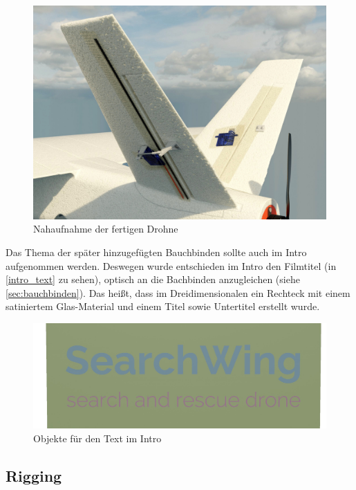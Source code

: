 \begin{figure}[H]
\begin{center}
\includegraphics[width=\textwidth]{gfx/prod/plane/shading.jpg}
\caption{Nahaufnahme der fertigen Drohne}
\label{shading}
\end{center}
\end{figure}

Das Thema der später hinzugefügten Bauchbinden sollte auch im Intro aufgenommen werden. Deswegen wurde entschieden im Intro den Filmtitel (in \autoref{intro_text} zu sehen), optisch an die Bachbinden anzugleichen (siehe \autoref{sec:bauchbinden}). Das heißt, dass im Dreidimensionalen ein Rechteck mit einem satiniertem Glas-Material und einem Titel sowie Untertitel erstellt wurde.

\begin{figure}[H]
\begin{center}
\includegraphics[width=\textwidth]{gfx/prod/env/intro_text.jpg}
\caption{Objekte für den Text im Intro}
\label{intro_text}
\end{center}
\end{figure}

\subsection{Rigging}

